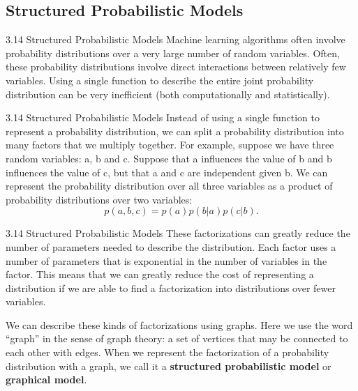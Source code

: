 \subsection{Structured Probabilistic Models}
\begin{frame}{3.14 Structured Probabilistic Models}
    \justifying
    Machine learning algorithms often involve probability distributions over a very large number of random variables. Often, these probability distributions involve direct interactions between relatively few variables. Using a single function to describe the entire joint probability distribution can be very inefficient (both computationally and statistically).
\end{frame}

\begin{frame}{3.14 Structured Probabilistic Models}
    \justifying
    Instead of using a single function to represent a probability distribution, we can split a probability distribution into many factors that we multiply together. For example, suppose we have three random variables: a, b and c. Suppose that a influences the value of b and b influences the value of c, but that a and c are independent given b. We can represent the probability distribution over all three variables as a product of probability distributions over two variables:
    \begin{equation}
        p(a, b, c) = p(a) p(b|a) p(c|b).
        \label{eq:3_52}
    \end{equation}
\end{frame}

\begin{frame}{3.14 Structured Probabilistic Models}
    \justifying
    These factorizations can greatly reduce the number of parameters needed to describe the distribution. Each factor uses a number of parameters that is exponential in the number of variables in the factor. This means that we can greatly reduce the cost of representing a distribution if we are able to find a factorization into distributions over fewer variables.
    
    We can describe these kinds of factorizations using graphs. Here we use the word ``graph'' in the sense of graph theory: a set of vertices that may be connected to each other with edges. When we represent the factorization of a probability distribution with a graph, we call it a \textbf{structured probabilistic model} or \textbf{graphical model}.
\end{frame}

